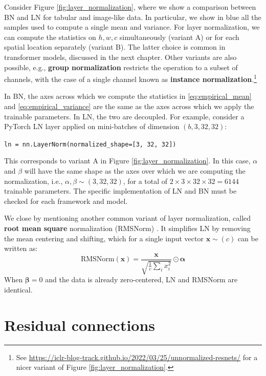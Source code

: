 Consider Figure \ref{fig:layer_normalization}, where we show a comparison between BN and LN for tabular and image-like data. In particular, we show in blue all the samples used to compute a single mean and variance. For layer normalization, we can compute the statistics on $h,w,c$ simultaneously (variant A) or for each spatial location separately (variant B). The latter choice is common in transformer models, discussed in the next chapter. Other variants are also possible, e.g., \textbf{group normalization} restricts the operation to a subset of channels, with the case of a single channel known as \textbf{instance normalization}.\footnote{See \url{https://iclr-blog-track.github.io/2022/03/25/unnormalized-resnets/} for a nicer variant of Figure \ref{fig:layer_normalization}.}

In BN, the axes across which we compute the statistics in \eqref{eq:empirical_mean} and \eqref{eq:empirical_variance} are the same as the axes across which we apply the trainable parameters. In LN, the two are decoupled. For example, consider a PyTorch LN layer applied on mini-batches of dimension $(b, 3, 32, 32)$:

{\footnotesize
\noindent\texttt{ln = nn.LayerNorm(normalized_shape=[3, 32, 32])}
}

This corresponds to variant A in Figure \ref{fig:layer_normalization}. In this case, $\alpha$ and $\beta$ will have the same shape as the axes over which we are computing the normalization, i.e., $\alpha, \beta \sim (3,32,32)$, for a total of $2\times3\times32\times32=6144$ trainable parameters. The specific implementation of LN and BN must be checked for each framework and model.

We close by mentioning another common variant of layer normalization, called \textbf{root mean square} normalization (RMSNorm) \cite{zhang2019root}. It simplifies LN by removing the mean centering and shifting, which for a single input vector $\mathbf{x} \sim (c)$ can be written as:
%
\begin{equation}
\text{RMSNorm}(\mathbf{x}) = \frac{\mathbf{x}}{\sqrt{\frac{1}{c}\sum_i x_i^2}} \odot \mathbf{\alpha} 
\end{equation}
%
When $\mathbf{\beta} = 0$ and the data is already zero-centered, LN and RMSNorm are identical.

\section{Residual connections}
\label{sec:residual_connections}

